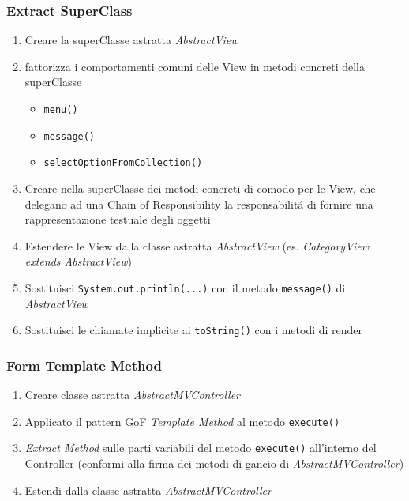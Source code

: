 \begin{frame}
    \frametitle{Extract SuperClass}
    \begin{enumerate}
        \item Creare la superClasse astratta \emph{AbstractView}
        \item fattorizza i comportamenti comuni delle View in metodi concreti della superClasse
          \begin{itemize}
              \item \texttt{menu()}
              \item \texttt{message()}
              \item \texttt{selectOptionFromCollection()}
          \end{itemize}
        \item Creare nella superClasse dei metodi concreti di comodo per le View, che delegano ad una Chain of Responsibility la responsabilitá
              di fornire una rappresentazione testuale degli oggetti
        \item Estendere le View dalla classe astratta \emph{AbstractView} (es. \emph{CategoryView extends AbstractView})
        \item Sostituisci \texttt{System.out.println(...)} con il metodo \texttt{message()} di \emph{AbstractView}
        \item Sostituisci le chiamate implicite ai \texttt{toString()} con i metodi di render
    \end{enumerate}
\end{frame}

\begin{frame}
    \frametitle{Form Template Method}
    \begin{enumerate}
        \item Creare classe astratta \emph{AbstractMVController}
        \item Applicato il pattern GoF \emph{Template Method} al metodo \texttt{execute()}
        \item \emph{Extract Method} sulle parti variabili del metodo \texttt{execute()} all'interno del Controller (conformi alla firma dei metodi di gancio di \emph{AbstractMVController})
        \item Estendi dalla classe astratta \emph{AbstractMVController}
    \end{enumerate}
\end{frame}

